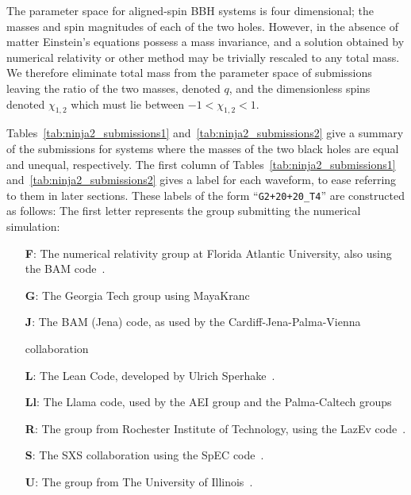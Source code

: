 The parameter space for aligned-spin BBH systems is four dimensional;
the masses and spin magnitudes of each of the two holes.  However, in
the absence of matter Einstein's equations possess a mass invariance,
and a solution obtained by numerical relativity or other method may be
trivially rescaled to any total mass.  We therefore eliminate total
mass from the parameter space of submissions leaving the ratio of the
two masses, denoted $q$, and the dimensionless spins denoted
$\chi_{1,2}$ which must lie between $-1 < \chi_{1,2} < 1$.

Tables~\ref{tab:ninja2_submissions1} and~\ref{tab:ninja2_submissions2} give a
summary of the submissions for systems where the masses of the two
black holes are equal and unequal, respectively. The first column of 
Tables~\ref{tab:ninja2_submissions1}
and~\ref{tab:ninja2_submissions2} gives a label for each waveform, to
ease referring to them in later sections.  These labels of the
form ``{\tt G2+20+20\_T4}'' are constructed as follows: The first letter
represents the group submitting the numerical simulation:
\begin{itemize}
\item[{\bf F}:] The numerical relativity group at Florida Atlantic University, 
also using the BAM 
code~\cite{Tichy:2010qa,Brugmann:2008zz,Marronetti:2007ya,Bruegmann:2003aw}.
\item[{\bf G}:] The Georgia Tech group using 
MayaKranc~\cite{Healy:2008js,Healy:2009ir,Bode:2009mt,Herrmann:2007ex,
Healy:2009zm,Bode:2011tq,Hinder:2007qu}
\item[{\bf J}:] The BAM (Jena) code, as used by the Cardiff-Jena-Palma-Vienna
  
collaboration~\cite{Husa:2007hp,Hannam:2007wf,Ajith:2009bn,Hannam:2010ec,
Brugmann:2008zz,Hannam:2007ik}
\item[{\bf L}:] The Lean Code, developed by Ulrich 
Sperhake~\cite{Sperhake:2006cy,Sperhake:2007gu}.
\item[{\bf Ll}:] The Llama code, used by the AEI group and the Palma-Caltech 
groups~\cite{Pollney:2010hs,Reisswig:2009rx,Pollney:2009yz}
\item[{\bf R}:] The group from Rochester Institute of Technology, using the
  LazEv code~\cite{Campanelli:2005dd,Lousto:2010tb,Lousto:2010qx,Nakano:2011pb}.
\item[{\bf S}:] The SXS collaboration using the SpEC 
code~\cite{Pfeiffer:2002wt,Scheel:2006gg,Lovelace:2011nu,Szilagyi:2009qz,
Lovelace:2010ne,Scheel:2008rj,SpECWebsite,Boyle:2007ft,Lindblom:2005qh,
Boyle:2009vi}.
\item[{\bf U}:] The group from The University of Illinois~\cite{Etienne:2008re}.
\end{itemize}
